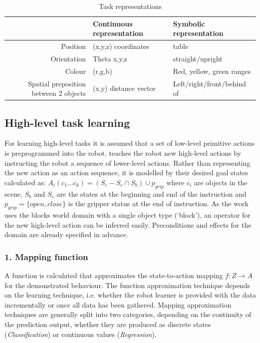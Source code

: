 \begin{table}[ht]
\centering
\caption{Task representations}
\label{tab:representations}
\begin{tabular}{r|ll}
 & Continuous representation & Symbolic representation\\ \hline
Position & (x,y,z) coordinates & table \\
Orientation  & Theta x,y,z  & straight/upright \\
Colour & (r,g,b) & Red, yellow, green ranges\\
Spatial preposition between 2 objects & (x,y) distance vector & Left/right/front/behind of 
\end{tabular}
\end{table}

\subsection{High-level task learning}
For learning high-level tasks it is assumed that a set of low-level primitive actions is preprogrammed into the robot. 
\cite{she2014teaching} teaches the robot new high-level actions by instructing the robot a sequence of lower-level actions.
Rather than representing the new action as an action sequence, it is modelled by their desired goal states calculated as:
$A_i(c_1 \dots c_k) = (S_e - S_e \cap S_b) \cup p_{grip}$ where $c_i$ are objects in the scene, $S_b$ and $S_e$ are the states at the beginning and end of the instruction and $p_{grip} = \{open, close\}$ is the gripper status at the end of instruction.
As the work uses the blocks world domain with a single object type (`block'), an operator for the new high-level action can be inferred easily. Preconditions and effects for the domain are already specified in advance.


\subsubsection{1. Mapping function} 
A function is calculated that approximates the state-to-action mapping $f : Z \rightarrow A$ for the demonstrated behaviour. The function approximation technique depends on the learning technique, i.e. whether the robot learner is provided with the data incrementally or once all data has been gathered. Mapping approximation techniques are generally split into two categories, depending on the continuity of the prediction output, whether they are produced as discrete states (\textit{Classification}) or continuous values (\textit{Regression}).\cite{argall2009survey}

